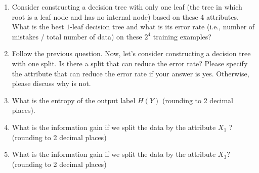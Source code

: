 \documentclass[11pt]{article}
\begin{document}
\begin{enumerate}
\item {} Consider constructing a decision tree with only one leaf (the tree in which root is a leaf node and has no internal node) based on these 4 attributes. What is the best $1$-leaf decision tree and what is its error rate (i.e., number of mistakes / total number of data) on these $2^4$ training examples? 


\item {} Follow the previous question. Now, let's consider constructing a decision tree with one split. Is there a split that can reduce the error rate? Please specify the attribute that can reduce the error rate if your answer is yes. Otherwise, please discuss why is not. 

\item {} What is the entropy of the output label $H(Y)$ (rounding to 2 decimal places).

\item {} What is the information gain if we split the data by the attribute $X_1$ ? (rounding to 2 decimal places)

\item {} What is the information gain if we split the data by the attribute $X_3$? (rounding to 2 decimal places)

\end{enumerate}

\ifsoln 
\else
\clearpage
\fi



\end{document}
